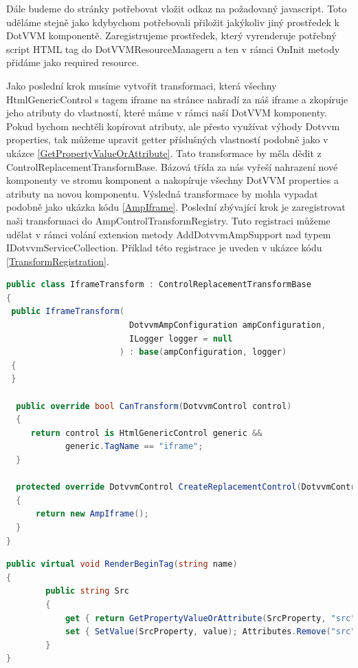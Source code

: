 Dále budeme do stránky potřebovat vložit odkaz na požadovaný javascript. Toto uděláme stejně jako kdybychom potřebovali přiložit jakýkoliv jiný prostředek k DotVVM komponentě. Zaregistrujeme prostředek, který vyrenderuje potřebný script HTML tag do DotVVMResourceManageru a ten v rámci OnInit metody přidáme jako required resource.

Jako poslední krok musíme vytvořit transformaci, která všechny HtmlGenericControl s tagem iframe na stránce nahradí za náš iframe a zkopíruje jeho atributy do vlastností, které máme v rámci naší DotVVM komponenty. Pokud bychom nechtěli kopírovat atributy, ale přesto využívat výhody Dotvvm properties, tak můžeme upravit getter příslušných vlastností podobně jako v ukázce \ref{GetPropertyValueOrAttribute}.  Tato transformace by měla dědit z ControlReplacementTransformBase. Bázová třída za nás vyřeší nahrazení nové komponenty ve stromu komponent a nakopíruje všechny DotVVM properties a atributy na novou komponentu. Výsledná transformace by mohla vypadat podobně jako ukázka kódu  \ref{AmpIframe}. Poslední zbývající krok je zaregistrovat naši transformaci do AmpControlTransformRegistry. Tuto registraci můžeme udělat v rámci volání extension metody AddDotvvmAmpSupport nad typem IDotvvmServiceCollection. Příklad této registrace je uveden v ukázce kódu \ref{TransformRegistration}.
\begin{lstlisting}[language=c#, caption=Ukázka možné implementace tranformace pro iframe,label=AmpIframe,captionpos=t]
public class IframeTransform : ControlReplacementTransformBase
{
 public IframeTransform(
                         DotvvmAmpConfiguration ampConfiguration,
                         ILogger logger = null
                       ) : base(ampConfiguration, logger)
 {
 }

  public override bool CanTransform(DotvvmControl control)
  {
     return control is HtmlGenericControl generic &&
            generic.TagName == "iframe";
  }

  protected override DotvvmControl CreateReplacementControl(DotvvmControl control)
  {
      return new AmpIframe();
  }
}
\end{lstlisting}

\begin{lstlisting}[language=c#, caption=Možný způsob jak se vyhnout kopírování HTML atributů do DotVVM property.r ,label=GetPropertyValueOrAttribute,captionpos=t]
public virtual void RenderBeginTag(string name)
{
        public string Src
        {
            get { return GetPropertyValueOrAttribute(SrcProperty, "src"); }
            set { SetValue(SrcProperty, value); Attributes.Remove("src"); }
        }
}
\end{lstlisting}

